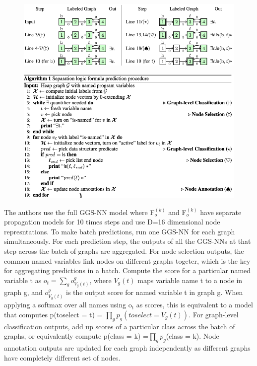 \documentclass{article}
\begin{document}
\begin{figure}[ht]
\vskip 0.2in
\begin{center}
\centerline{\includegraphics[width=\columnwidth]{Images/Bug1-3.png}}
\label{icml-historical}
\end{center}
\vskip -0.2in
\end{figure}

\begin{figure}[ht]
\vskip 0.2in
\begin{center}
\centerline{\includegraphics[width=\columnwidth]{Images/Bug1-4.png}}
\label{icml-historical}
\end{center}
\vskip -0.2in
\end{figure}

The authors use the full GGS-NN model where F$_o^{(k)}$ and F$_o^{(k)}$ have separate propagation models for 10 times steps and use D=16 dimensional node represntations. To make batch predictions, run one GGS-NN for each graph simultaneously. For each prediction step, the outputs of all the GGS-NNs at that step across the batch of graphs are aggregated. For node selection outputs, the common named variables link nodes on different graphs togeter, which is the key for aggregating predictions in a batch. Compute the score for a particular named variable t as $o_t = \sum_g o_{V_g(t)}^g$, where $V_g(t)$ maps variable name t to a node in graph g, and $o_{V_g(t)}^g$ is the output score for named variable t in graph g. When applying a softmax over all names using o$_t$ as scores, this is equivalent to a model that computes p(toselect = t) = $\prod _g p_g(toselect = V_g(t))$. For graph-level classification outputs, add up scores of a particular class across the batch of graphs, or equivalently compute p(class = k) =$\prod _g p_g$(class = k). Node annotation outputs are updated for each graph independently as different graphs have completely different set of nodes.
\end{document}
